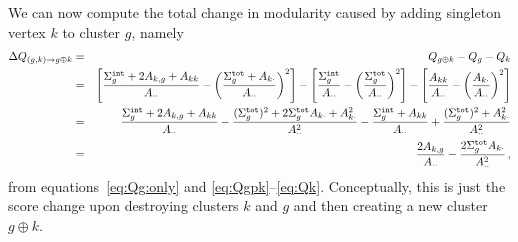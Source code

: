 \documentclass[a4paper]{article}
\begin{document}
We can now compute the total change in modularity caused by adding singleton vertex $k$
to cluster $g$, namely
\begin{eqnarray}
    \Delta Q_{(g,k)\rightarrow g\oplus k} & = & Q_{g\oplus k}-Q_g-Q_k
\nonumber\\&=&
    \left[\frac{\Sigma_{g}^{\tt int}+2A_{k,g}+A_{kk}}{A_{\cdot\cdot}}
    -\left(\frac{\Sigma_{g}^{\tt tot}+A_{k\cdot}}{A_{\cdot\cdot}}\right)^2\right]
-\left[\frac{\Sigma_{g}^{\tt int}}{A_{\cdot\cdot}}
    -\left(\frac{\Sigma_{g}^{\tt tot}}{A_{\cdot\cdot}}\right)^2\right]
    -\left[\frac{A_{kk}}{A_{\cdot\cdot}}
    -\left(\frac{A_{k\cdot}}{A_{\cdot\cdot}}\right)^2\right]
\nonumber\\&=&
\frac{\Sigma_{g}^{\tt int}+2A_{k,g}+A_{kk}}{A_{\cdot\cdot}}
-\frac{(\Sigma_{g}^{\tt tot})^2+2\Sigma_{g}^{\tt tot}
A_{k\cdot}+A_{k\cdot}^2}{A_{\cdot\cdot}^2} 
-\frac{\Sigma_{g}^{\tt int}+A_{kk}}{A_{\cdot\cdot}}
+\frac{(\Sigma_{g}^{\tt tot})^2+A_{k\cdot}^2}{A_{\cdot\cdot}^2}
\nonumber\\&=&
    \frac{2A_{k,g}}{A_{\cdot\cdot}}-\frac{2\Sigma_g^{\tt tot}A_{k\cdot}}{A_{\cdot\cdot}^2}\,,
\label{eq:delta:Q:plus}
\end{eqnarray}
from equations~\eqref{eq:Qg:only} and \eqref{eq:Qgpk}--\eqref{eq:Qk}.
Conceptually, this is just the score change upon destroying clusters $k$ and $g$ and then creating a new cluster $g\oplus k$.
\end{document}
